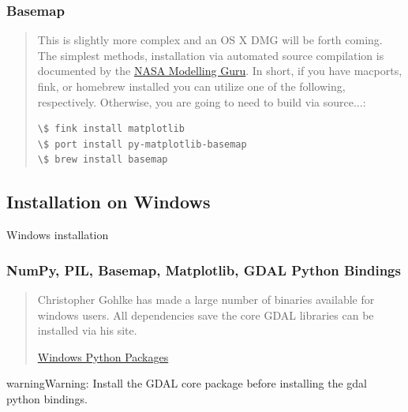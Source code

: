 \documentclass[letterpaper,10pt,english]{sphinxmanual}
\begin{document}
\subsubsection{Basemap}
\label{Installation:id2}\begin{quote}

This is slightly more complex and an OS X DMG will be forth coming.  The simplest methods, installation via automated source compilation is documented by the \href{https://modelingguru.nasa.gov/docs/DOC-1847}{NASA Modelling Guru}.  In short, if you have macports, fink, or homebrew installed you can utilize one of the following, respectively.  Otherwise, you are going to need to build via source...:

\begin{Verbatim}[commandchars=\\\{\}]
\$ fink install matplotlib
\$ port install py-matplotlib-basemap
\$ brew install basemap
\end{Verbatim}
\end{quote}


\subsection{Installation on Windows}
\label{Installation:installation-on-windows}
Windows installation


\subsubsection{NumPy, PIL, Basemap, Matplotlib, GDAL Python Bindings}
\label{Installation:numpy-pil-basemap-matplotlib-gdal-python-bindings}\begin{quote}

Christopher Gohlke has made a large number of binaries available for windows users.  All dependencies save the core GDAL libraries can be installed via his site.

\href{http://www.lfd.uci.edu/~gohlke/pythonlibs/}{Windows Python Packages}
\end{quote}

\begin{notice}{warning}{Warning:}
Install the GDAL core package before installing the gdal python bindings.
\end{notice}
\end{document}
